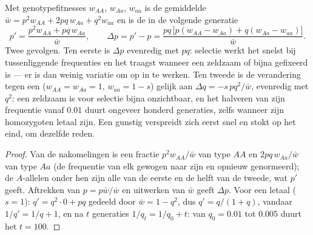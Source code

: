 \begin{theorem}\label{thm:b2:population-genetics:selection}
Met genotypefitnesses $w_{AA}$, $w_{Aa}$, $w_{aa}$ is de gemiddelde
 $\bar w = p^{2}w_{AA} + 2pq\,w_{Aa} + q^{2}w_{aa}$ en is de
 in de volgende generatie
\[
p' = \frac{p^{2}w_{AA} + pq\,w_{Aa}}{\bar w}, \qquad
\Delta p = p' - p = \frac{pq\,\bigl[p(w_{AA} - w_{Aa}) + q(w_{Aa} - w_{aa})\bigr]}{\bar w}.
\]
Twee gevolgen. Ten eerste is $\Delta p$ evenredig met $pq$: selectie
werkt het snelst bij tussenliggende frequenties en het traagst wanneer een
 zeldzaam of bijna gefixeerd is --- er is dan weinig variatie om op in te
werken. Ten tweede is de verandering tegen een   ($w_{AA} = w_{Aa} = 1$, $w_{aa} =
1 - s$) gelijk aan $\Delta q = -s\,pq^{2}/\bar w$, evenredig
met $q^{2}$: een zeldzaam   is voor selectie bijna onzichtbaar,
en het halveren van zijn frequentie vanaf $0.01$ duurt ongeveer honderd
generaties, zelfs wanneer zijn homozygoten letaal zijn. Een gunstig 
 verspreidt zich eerst snel en stokt op het eind, om dezelfde
reden.
\end{theorem}
\begin{proof}
Van de nakomelingen is een fractie $p^{2}w_{AA}/\bar w$ van type $AA$ en
$2pq\,w_{Aa}/\bar w$ van type $Aa$ (de frequentie van elk  gewogen naar
zijn  en opnieuw genormeerd); de $A$-allelen onder hen zijn alle van
de eerste en de helft van de tweede, wat $p'$ geeft. Aftrekken van $p =
p\bar w/\bar w$ en uitwerken van $\bar w$ geeft $\Delta p$. Voor een letaal
  ($s = 1$): $q' = q^{2}\cdot 0 + pq$ gedeeld door $\bar w = 1 -
q^{2}$, dus $q' = q/(1 + q)$, vandaar $1/q' = 1/q + 1$, en na $t$
generaties $1/q_t = 1/q_0 + t$: van $q_0 = 0.01$ tot $0.005$ duurt het
$t = 100$.
\end{proof}

